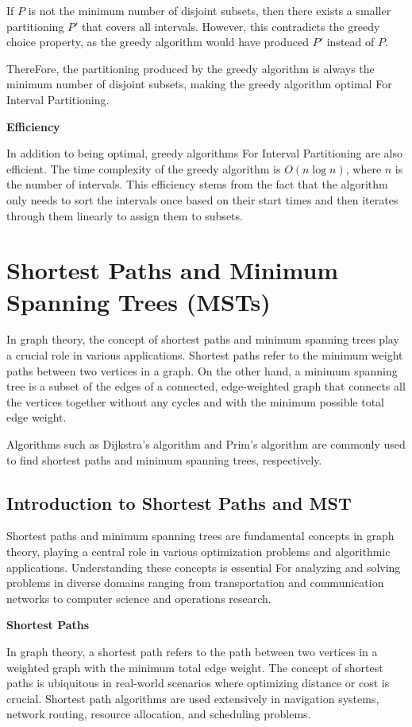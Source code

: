 \documentclass[12pt]{book} %
\begin{document}
If \( P \) is not the minimum number of disjoint subsets, then there exists a smaller partitioning \( P' \) that covers all intervals. However, this contradicts the greedy choice property, as the greedy algorithm would have produced \( P' \) instead of \( P \).

ThereFore, the partitioning produced by the greedy algorithm is always the minimum number of disjoint subsets, making the greedy algorithm optimal For Interval Partitioning.

\textbf{Efficiency}

In addition to being optimal, greedy algorithms For Interval Partitioning are also efficient. The time complexity of the greedy algorithm is \( O(n \log n) \), where \( n \) is the number of intervals. This efficiency stems from the fact that the algorithm only needs to sort the intervals once based on their start times and then iterates through them linearly to assign them to subsets.

\section{Shortest Paths and Minimum Spanning Trees (MSTs)}
In graph theory, the concept of shortest paths and minimum spanning trees play a crucial role in various applications. Shortest paths refer to the minimum weight paths between two vertices in a graph. On the other hand, a minimum spanning tree is a subset of the edges of a connected, edge-weighted graph that connects all the vertices together without any cycles and with the minimum possible total edge weight.

Algorithms such as Dijkstra's algorithm and Prim's algorithm are commonly used to find shortest paths and minimum spanning trees, respectively.

\subsection{Introduction to Shortest Paths and MST}


Shortest paths and minimum spanning trees are fundamental concepts in graph theory, playing a central role in various optimization problems and algorithmic applications. Understanding these concepts is essential For analyzing and solving problems in diverse domains ranging from transportation and communication networks to computer science and operations research.

\textbf{Shortest Paths}

In graph theory, a shortest path refers to the path between two vertices in a weighted graph with the minimum total edge weight. The concept of shortest paths is ubiquitous in real-world scenarios where optimizing distance or cost is crucial. Shortest path algorithms are used extensively in navigation systems, network routing, resource allocation, and scheduling problems.
\end{document}
